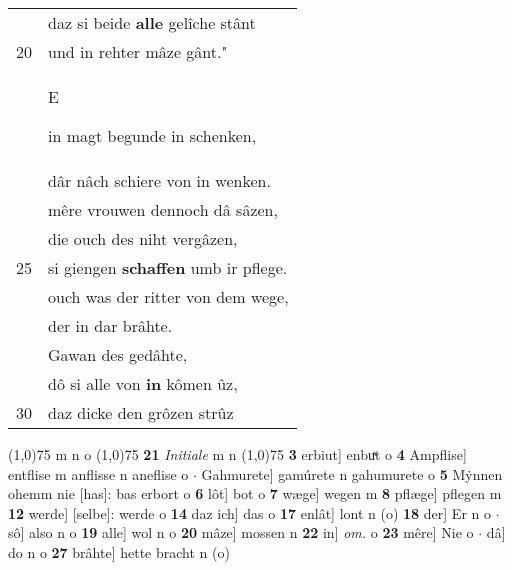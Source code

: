\documentclass[8pt,a4paper,notitlepage]{article}
\begin{document}
\begin{table}[ht]
\begin{minipage}[t]{0.5\linewidth}
\begin{tabular}{rl}
 & daz si beide \textbf{alle} gelîche stânt\\ 
20 & und in rehter mâze gânt."\\ 
 & \begin{large}E\end{large}in magt begunde in schenken,\\ 
 & dâr nâch schiere von in wenken.\\ 
 & mêre vrouwen dennoch dâ sâzen,\\ 
 & die ouch des niht vergâzen,\\ 
25 & si giengen \textbf{schaffen} umb ir pflege.\\ 
 & ouch was der ritter von dem wege,\\ 
 & der in dar brâhte.\\ 
 & Gawan des gedâhte,\\ 
 & dô si alle von \textbf{in} kômen ûz,\\ 
30 & daz dicke den grôzen strûz\\ 
\end{tabular}
\scriptsize
\line(1,0){75} \newline
m n o \newline
\line(1,0){75} \newline
\textbf{21} \textit{Initiale} m n  \newline
\line(1,0){75} \newline
\textbf{3} erbiut] enbuͯt o \textbf{4} Ampflise] entflise m anflisse n aneflise o  $\cdot$ Gahmurete] gamúrete n gahumurete o \textbf{5} Mẏnnen ohemm nie [has]: bas erbort o \textbf{6} lôt] bot o \textbf{7} wæge] wegen m \textbf{8} pflæge] pflegen m \textbf{12} werde] [selbe]: werde o \textbf{14} daz ich] das o \textbf{17} enlât] lont n (o) \textbf{18} der] Er n o  $\cdot$ sô] also n o \textbf{19} alle] wol n o \textbf{20} mâze] mossen n \textbf{22} in] \textit{om.} o \textbf{23} mêre] Nie o  $\cdot$ dâ] do n o \textbf{27} brâhte] hette bracht n (o) \newline
\end{minipage}
\end{table}
\newpage
\end{document}
